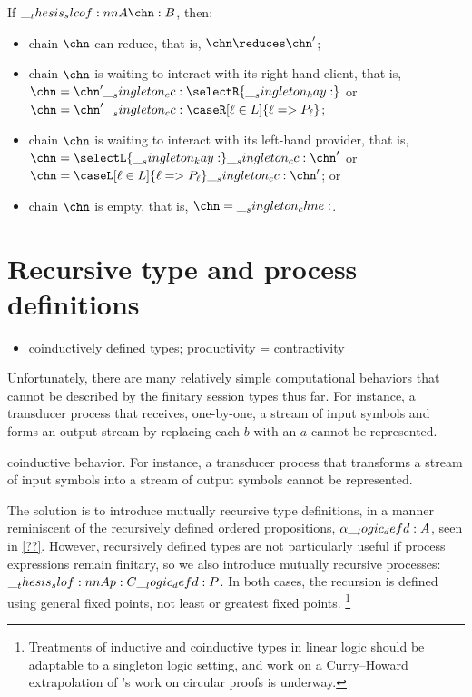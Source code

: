 \begin{theorem}[Progress]
  If $\slcof{A |- \chn : B}$, then:
  \begin{itemize}
  \item chain $\chn$ can reduce, that is, $\chn \reduces \chn'$;
  \item chain $\chn$ is waiting to interact with its right-hand client, that is, $\chn = \chn' \cc \selectR{\kay}$ or $\chn = \chn' \cc \caseR[\ell \in L]{\ell => P_{\ell}}$;
  \item chain $\chn$ is waiting to interact with its left-hand provider, that is, $\chn = \selectL{\kay} \cc \chn'$ or $\chn = \caseL[\ell \in L]{\ell => P_{\ell}} \cc \chn'$; or
  \item chain $\chn$ is empty, that is, $\chn = \chne$.
  \end{itemize}
\end{theorem}


\section{Recursive type and process definitions}

\begin{itemize}
\item coinductively defined types; productivity = contractivity
\end{itemize}

Unfortunately, there are many relatively simple computational behaviors that cannot be described by the finitary session types thus far.
For instance, a transducer process that receives, one-by-one, a stream of input symbols and forms an output stream by replacing each $b$ with an $a$ cannot be represented.

coinductive behavior.
For instance, a transducer process that transforms a stream of input symbols into a stream of output symbols cannot be represented.

The solution is to introduce mutually recursive type definitions, in a manner reminiscent of the recursively defined ordered propositions, $\alpha \__logic_defd: A$, seen in \cref{??}.
However, recursively defined types are not particularly useful if process expressions remain finitary, so we also introduce mutually recursive processes: $\slof{A |- p : C} \defd P$.
In both cases, the recursion is defined using general fixed points, not least or greatest fixed points.%
\footnote{Treatments of inductive and coinductive types in linear logic\autocite{Baelde:?,Toninho+:TGC14} should be adaptable to a singleton logic setting, and work on a Curry--Howard extrapolation of \citeauthor{Fortier-Santocanale:CSL?}'s work on circular proofs\autocite{Fortier-Santocanale:CSL?} is underway.}


